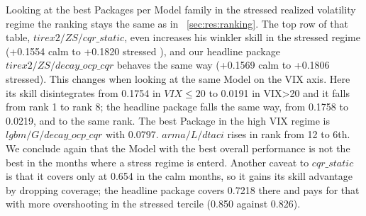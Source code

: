 Looking at the best Packages per Model family in the stressed realized volatility regime the ranking stays the same as in ~\ref{sec:res:ranking}. The top row of that table, $tirex2/ZS/cqr\_static$, even increases his winkler skill in the stressed regime (+0.1554 calm to +0.1820 stressed ), and our headline package $tirex2/ZS/decay\_ocp\_cqr$ behaves the same way (+0.1569 calm to +0.1806 stressed). This changes when looking at the same Model on the VIX axis. Here its skill disintegrates from 0.1754 in $VIX\leq20$ to 0.0191 in VIX>20 and it falls from rank 1 to rank 8; the headline package falls the same way, from 0.1758 to 0.0219, and to the same rank. The best Package in the high VIX regime is $lgbm/G/decay\_ocp\_cqr$ with 0.0797. $arma/L/dtaci$ rises in rank from 12 to 6th. We conclude again that the Model with the best overall performance is not the best in the months where a stress regime is enterd. Another caveat to $cqr\_static$ is that it covers only at 0.654 in the calm months, so it gains its skill advantage by dropping coverage; the headline package covers 0.7218 there and pays for that with more overshooting in the stressed tercile (0.850 against 0.826).\\
